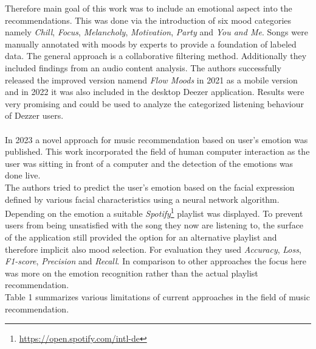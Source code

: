\documentclass[runningheads,a4paper]{llncs}
\begin{document}
Therefore main goal of this work was to include an emotional aspect into the recommendations.
This was done via the introduction of six mood categories namely \textit{Chill}, \textit{Focus}, \textit{Melancholy}, \textit{Motivation}, \textit{Party} and \textit{You and Me}.
Songs were manually annotated with moods by experts to provide a foundation of labeled data. The general approach is a collaborative filtering method. Additionally they included findings from an audio content analysis.
The authors successfully released the improved version namend \textit{Flow Moods} in 2021 as a mobile version and in 2022 it was also included in the desktop Deezer application.
Results were very promising and could be used to analyze the categorized listening behaviour of Dezzer users. 
\cite{bontempelli2022flow}\\
\\
In 2023 a novel approach for music recommendation based on user's emotion was published. 
This work incorporated the field of human computer interaction as the user 
was sitting in front of a computer and the detection of the emotions was done live. \\
The authors tried to predict the user's emotion based on the facial expression defined by various facial characteristics using a neural network algorithm.\\
Depending on the emotion a suitable \textit{Spotify}\footnote{\url{https://open.spotify.com/intl-de}} playlist was displayed.
To prevent users from being unsatisfied with the song they now are listening to, the surface of the application still provided the option for an alternative playlist and therefore implicit also mood selection.
For evaluation they used \textit{Accuracy}, \textit{Loss}, \textit{F1-score}, \textit{Precision} and \textit{Recall}.
In comparison to other approaches the focus here was more on the emotion recognition rather than the actual playlist recommendation.\cite{priyanka2023novel}\\
Table 1 summarizes various limitations of current approaches in the field of music recommendation. 
\end{document}
